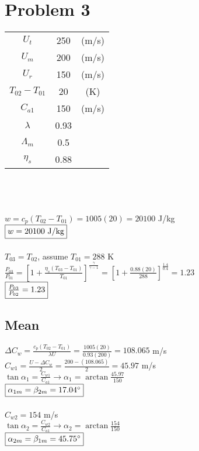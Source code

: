 \documentclass{article}
\begin{document}
\section*{Problem 3}
\begin{tabular}{ccc}
   $U_{t}$ & 250 & (m/s) \\
   $U_{m}$ & 200 & (m/s) \\
   $U_{r}$ & 150 & (m/s) \\
   $T_{02}-T_{01}$ & 20 & (K) \\
   $C_{a1}$ & 150 & (m/s) \\
   $\lambda$ & 0.93 \\
   $\Lambda_m$ & 0.5 \\
   $\eta_s$ & 0.88
\end{tabular} \\\\\\
$w=c_p(T_{02}-T_{01})=1005(20)=20100$ J/kg \\
$\fbox{$w=20100$ J/kg}$ \\\\
$T_{03}=T_{02}$, \quad assume $T_{01}=288$ K \\
$\frac{P_{03}}{P_{01}}=[1+\frac{\eta_s(T_{03}-T_{01})}{T_{01}}]^\frac{\gamma}{\gamma-1}
=[1+\frac{0.88(20)}{288}]^\frac{1.4}{0.4}=1.23$ \\
$\fbox{$\frac{P_{03}}{P_{02}}=1.23$}$

\subsection*{Mean}
$\Delta C_w=\frac{c_p(T_{02}-T_{01})}{\lambda U}=\frac{1005(20)}{0.93(200)}=
108.065$ m/s \\
$C_{w1}=\frac{U-\Delta C_w}{2}=\frac{200-(108.065)}{2}=45.97$ m/s \\
$\tan{\alpha_1}=\frac{C_{w1}}{C_{a1}} \rightarrow \alpha_1=\arctan\frac{45.97}{150}$ \\
$\fbox{$\alpha_{1m}=\beta_{2m}=17.04^\circ$}$ \\\\
$C_{w2}=154$ m/s \\
$\tan{\alpha_2}=\frac{C_{w2}}{C_{a1}} \rightarrow \alpha_2=\arctan\frac{154}{150}$ \\
$\fbox{$\alpha_{2m}=\beta_{1m}=45.75^\circ$}$
\end{document}
